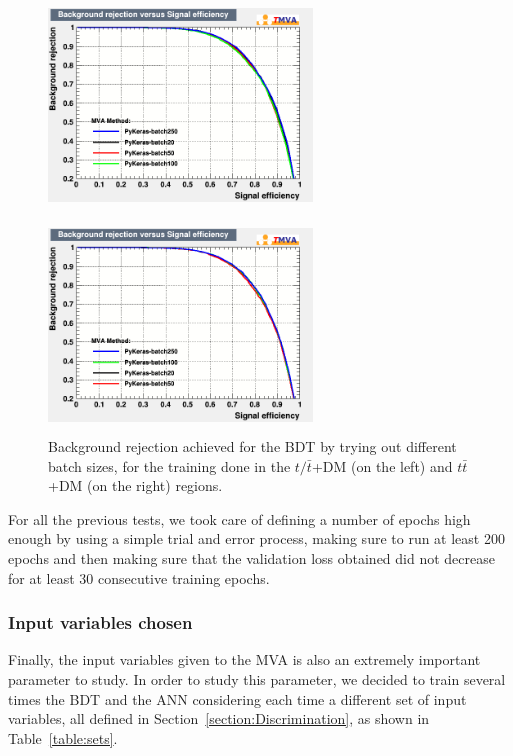 \documentclass[a4paper, 10pt, openright]{report}
\begin{document}
\begin{appendices}
\begin{figure}[htbp]
\centering
\begin{minipage}[b]{.48\textwidth}
\includegraphics[width=7cm, height=5.7cm]{figs/ANN_batch_ST.png}
\end{minipage}\hfill
\begin{minipage}[b]{.48\textwidth}
\includegraphics[width=7cm, height=5.7cm]{figs/ANN_batch_TTbar.png}
\end{minipage} \hfill
\caption{Background rejection achieved for the \ac{BDT} by trying out different batch sizes, for the training done in the $t/ \bar t$+DM (on the left) and $t \bar t$+DM (on the right) regions.}
\label{fig:optBatch}
\end{figure}

For all the previous tests, we took care of defining a number of epochs high enough by using a simple trial and error process, making sure to run at least 200 epochs and then making sure that the validation loss obtained did not decrease for at least 30 consecutive training epochs.  

\subsubsection{Input variables chosen}

Finally, the input variables given to the \ac{MVA} is also an extremely important parameter to study. In order to study this parameter, we decided to train several times the \ac{BDT} and the \ac{ANN} considering each time a different set of input variables, all defined in Section~\ref{section:Discrimination}, as shown in Table~\ref{table:sets}. %


\end{appendices}
\end{document}
